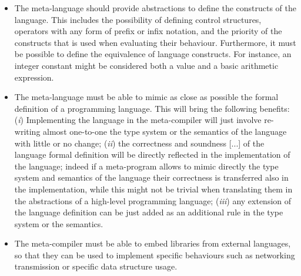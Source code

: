 \begin{itemize}
	\item The meta-language should provide abstractions to define the constructs of the language. This includes the possibility of defining control structures, operators with any form of prefix or infix notation, and the priority of the constructs that is used when evaluating their behaviour. Furthermore, it must be possible to define the equivalence of language constructs. For instance, an integer constant might be considered both a value and a basic arithmetic expression.
	
	\item The meta-language must be able to mimic as close as possible the formal definition of a programming language. This will bring the following benefits: (\textit{i}) Implementing the language in the meta-compiler will just involve re-writing almost one-to-one the type system or the semantics of the language with little or no change; (\textit{ii}) the correctness and soundness [...] of the language formal definition will be directly reflected in the implementation of the language; indeed if a meta-program allows to mimic directly the type system and semantics of the language their correctness is transferred also in the implementation, while this might not be trivial when translating them in the abstractions of a high-level programming language; (\textit{iii}) any extension of the language definition can be just added as an additional rule in the type system or the semantics.
	
	\item The meta-compiler must be able to embed libraries from external languages, so that they can be used to implement specific behaviours such as networking transmission or specific data structure usage.
\end{itemize}

